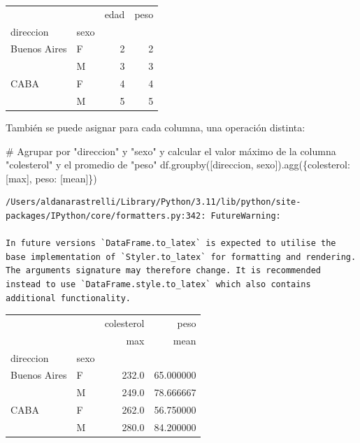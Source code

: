 \documentclass[
  letterpaper,
  DIV=11,
  numbers=noendperiod]{scrreprt}
\newenvironment{Shaded}{\begin{snugshade}}{\end{snugshade}}
\newcommand{\CommentTok}[1]{\textcolor[rgb]{0.37,0.37,0.37}{#1}}
\newcommand{\NormalTok}[1]{\textcolor[rgb]{0.00,0.23,0.31}{#1}}
\newcommand{\StringTok}[1]{\textcolor[rgb]{0.13,0.47,0.30}{#1}}
\begin{document}
\begin{tabular}{llrr}
\toprule
     &   &  edad &  peso \\
direccion & sexo &       &       \\
\midrule
Buenos Aires & F &     2 &     2 \\
     & M &     3 &     3 \\
CABA & F &     4 &     4 \\
     & M &     5 &     5 \\
\bottomrule
\end{tabular}

También se puede asignar para cada columna, una operación distinta:

\begin{Shaded}
\begin{Highlighting}[]
\CommentTok{\# Agrupar por "direccion" y "sexo" y calcular el valor máximo de la columna "colesterol" y el promedio de "peso"}
\NormalTok{df.groupby([}\StringTok{\textquotesingle{}direccion\textquotesingle{}}\NormalTok{, }\StringTok{\textquotesingle{}sexo\textquotesingle{}}\NormalTok{]).agg(\{}\StringTok{\textquotesingle{}colesterol\textquotesingle{}}\NormalTok{: [}\StringTok{\textquotesingle{}max\textquotesingle{}}\NormalTok{], }\StringTok{\textquotesingle{}peso\textquotesingle{}}\NormalTok{: [}\StringTok{\textquotesingle{}mean\textquotesingle{}}\NormalTok{]\})}
\end{Highlighting}
\end{Shaded}

\begin{verbatim}
/Users/aldanarastrelli/Library/Python/3.11/lib/python/site-packages/IPython/core/formatters.py:342: FutureWarning:

In future versions `DataFrame.to_latex` is expected to utilise the base implementation of `Styler.to_latex` for formatting and rendering. The arguments signature may therefore change. It is recommended instead to use `DataFrame.style.to_latex` which also contains additional functionality.
\end{verbatim}

\begin{tabular}{llrr}
\toprule
     &   & colesterol &       peso \\
     &   &        max &       mean \\
direccion & sexo &            &            \\
\midrule
Buenos Aires & F &      232.0 &  65.000000 \\
     & M &      249.0 &  78.666667 \\
CABA & F &      262.0 &  56.750000 \\
     & M &      280.0 &  84.200000 \\
\bottomrule
\end{tabular}
\end{document}
